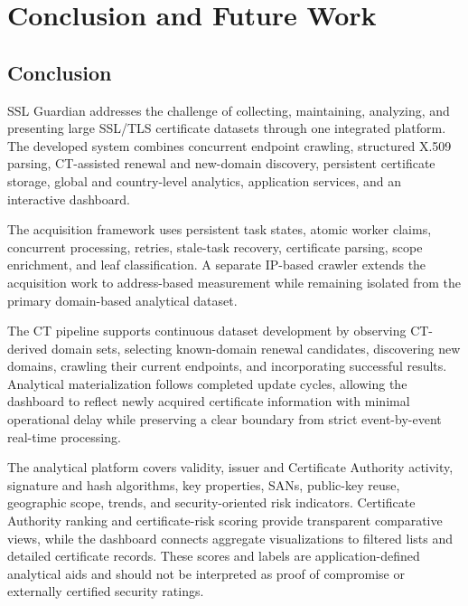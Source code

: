 
\chapter{Conclusion and Future Work}
\label{chap:conclusion-future-work}

\section{Conclusion}
\label{sec:conclusion}

SSL Guardian addresses the challenge of collecting, maintaining, analyzing, and
presenting large SSL/TLS certificate datasets through one integrated platform.
The developed system combines concurrent endpoint crawling, structured X.509
parsing, CT-assisted renewal and new-domain discovery, persistent certificate
storage, global and country-level analytics, application services, and an
interactive dashboard.

The acquisition framework uses persistent task states, atomic worker claims,
concurrent processing, retries, stale-task recovery, certificate parsing, scope
enrichment, and leaf classification. A separate IP-based crawler
extends the acquisition work to address-based measurement while remaining
isolated from the primary domain-based analytical dataset.

The CT pipeline supports continuous dataset development by observing
CT-derived domain sets, selecting known-domain renewal candidates, discovering
new domains, crawling their current endpoints, and incorporating successful
results. Analytical materialization follows completed update cycles, allowing
the dashboard to reflect newly acquired certificate information with minimal
operational delay while preserving a clear boundary from strict
event-by-event real-time processing.

The analytical platform covers validity, issuer and Certificate Authority
activity, signature and hash algorithms, key properties, SANs, public-key
reuse, geographic scope, trends, and security-oriented risk indicators.
Certificate Authority ranking and certificate-risk scoring provide transparent
comparative views, while the dashboard connects aggregate visualizations to
filtered lists and detailed certificate records. These scores and labels are
application-defined analytical aids and should not be interpreted as proof of
compromise or externally certified security ratings.

